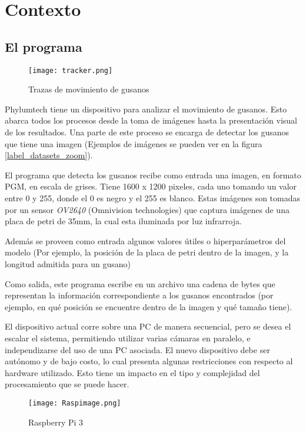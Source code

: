 \documentclass{article}
\begin{document}
\section{Contexto}

\subsection{El programa}

\begin{wrapfigure}{r}{0.4\textwidth}
\centering
    \texttt{[image: tracker.png]}
    \caption{Trazas de movimiento de gusanos}
    \label{label_tracker}
\end{wrapfigure}

Phylumtech tiene un dispositivo para analizar el movimiento de gusanos. Esto abarca todos los procesos desde la toma de imágenes hasta la presentación visual de los resultados. Una parte de este proceso se encarga de detectar los gusanos que tiene una imagen (Ejemplos de imágenes se pueden ver en la figura \ref{label_datasets_zoom}).

El programa que detecta los gusanos recibe como entrada una imagen, en formato PGM, en escala de grises. Tiene 1600 x 1200 pixeles, cada uno tomando un valor entre 0 y 255, donde el 0 es negro y el 255 es blanco. Estas imágenes son tomadas por un sensor \emph{OV2640} (Omnivision technologies) que captura imágenes de una placa de petri de 35mm, la cual esta iluminada por luz infrarroja.

Además se proveen como entrada algunos valores útiles o hiperparámetros del modelo (Por ejemplo, la posición de la placa de petri dentro de la imagen, y la longitud admitida para un gusano)

Como salida, este programa escribe en un archivo una cadena de bytes que representan la información correspondiente a los gusanos encontrados (por ejemplo, en qué posición se encuentre dentro de la imagen y qué tamaño tiene).

El dispositivo actual corre sobre una PC de manera secuencial, pero se desea el escalar el sistema, permitiendo utilizar varias cámaras en paralelo, e independizarse del uso de una PC asociada. El nuevo dispositivo debe ser autónomo y de bajo costo, lo cual presenta algunas restricciones con respecto al hardware utilizado. Esto tiene un impacto en el tipo y complejidad del procesamiento que se puede hacer.

\begin{wrapfigure}{l}{0.31\textwidth}
    \centering
    \texttt{[image: Raspimage.png]}
    \caption{Raspberry Pi 3}
    \label{label_raspimage}
\end{wrapfigure}
\end{document}
